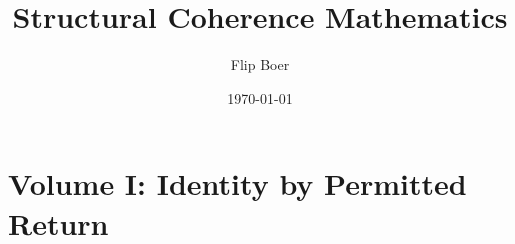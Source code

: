\documentclass[11pt]{book}
\title{Structural Coherence Mathematics}
\author{Flip Boer}
\date{\today}
\theoremstyle{definition}
\begin{document}
\maketitle
\tableofcontents

\part{Volume I: Identity by Permitted Return}


\appendix

\end{document}
